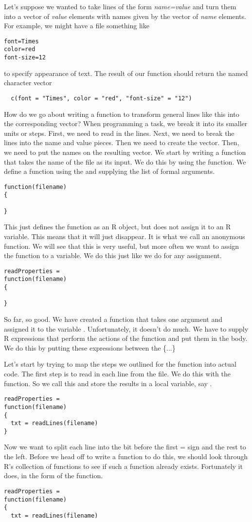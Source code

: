 {Let's suppose we wanted to take lines of the form {\em{name=value}}
and turn them into a vector of {\em{value}} elements with names given
by the vector of {\em{name}} elements. For example, we might have a
file something like
\begin{verbatim}
font=Times
color=red
font-size=12
\end{verbatim}
to specify appearance of text. The result of our function should
return the named character vector
\begin{verbatim}
  c(font = "Times", color = "red", "font-size" = "12")
\end{verbatim}
How do we go about writing a function to transform general lines like
this into the corresponding vector? When programming a task, we break
it into its smaller units or steps. First, we need to read in the
lines. Next, we need to break the lines into the name and value
pieces. Then we need to create the vector. Then, we need to put
the names on the resulting vector. We start by writing a function that
takes the name of the file as its input. We do this by using the
function. We define a function using the  and
supplying the list of formal arguments.
\begin{verbatim}
function(filename)
{

}
\end{verbatim}
This just defines the function as an R object, but does not assign it
to an R variable. This means that it will just disappear. It is what
we call an anonymous function. We will see that this is very useful,
but more often we want to assign the function to a variable. We do
this just like we do for any assignment.
\begin{verbatim}
readProperties =
function(filename) 
{

}
\end{verbatim}


So far, so good. We have created a function that takes one argument
and assigned it to the variable
. Unfortunately, it doesn't do much. We have
to supply R expressions that perform the actions of the function and
put them in the body. We do this by putting these expressions between
the \{...\}

Let's start by trying to map the steps we outlined for the function
into actual code. The first step is to read in each line from the
file. We do this with the  function. So we call
this and store the results in a local variable, say .
\begin{verbatim}
readProperties =
function(filename) 
{
  txt = readLines(filename)
}
\end{verbatim}
Now we want to split each line into the bit before the first = sign
and the rest to the left. Before we head off to write a function to do
this, we should look through R's collection of functions to see if
such a function already exists. Fortunately it does, in the form
of the  function.
\begin{verbatim}
readProperties =
function(filename) 
{
  txt = readLines(filename)


\end{verbatim}}
